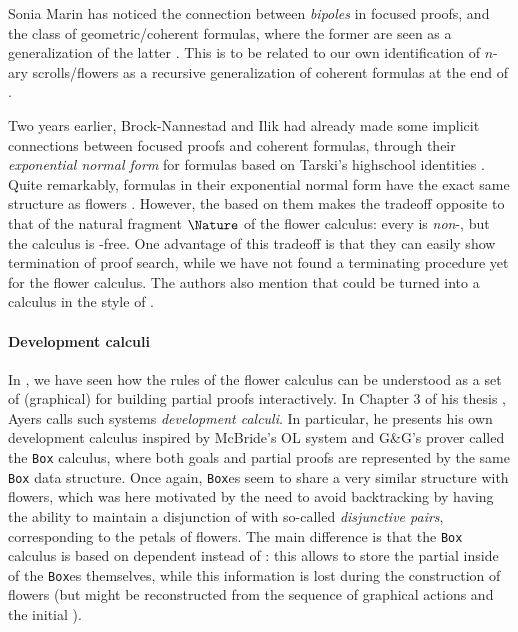 Sonia Marin has noticed the connection between \emph{bipoles} in focused proofs,
and the class of geometric/coherent formulas, where the former are seen as a
generalization of the latter . This is to be related
to our own identification of $n$-ary scrolls/flowers as a recursive
generalization of coherent formulas at the end of .

Two years earlier, Brock-Nannestad and Ilik had already made some implicit
connections between focused proofs and coherent formulas, through their
\emph{exponential normal form} for  formulas based on Tarski's
highschool identities . Quite
remarkably,  formulas in their exponential normal form have the exact
same structure as flowers
\cite[Definition~4.2]{brock-nannestad_intuitionistic_2019}. However, the   based on them makes the tradeoff opposite to that of the
natural fragment $\Nature$ of the flower calculus: every  is
\emph{non}-, but the calculus is -free. One advantage of
this tradeoff is that they can easily show termination of proof search, while we
have not found a terminating procedure yet for the flower calculus. The authors
also mention that  could be turned into a  calculus in the
style of .

\paragraph{Development calculi}

In , we have seen how the rules of the flower calculus
can be understood as a set of (graphical)  for building partial proofs
interactively. In Chapter 3 of his thesis , Ayers calls
such systems \emph{development calculi}. In particular, he presents his own
development calculus inspired by McBride's OL system
 and G\&G's prover
 called the \texttt{Box} calculus, where both
goals and partial proofs are represented by the same \texttt{Box} data
structure. Once again, \texttt{Box}es seem to share a very similar structure
with flowers, which was here motivated by the need to avoid backtracking by
having the ability to maintain a disjunction of  with so-called
\emph{disjunctive pairs}, corresponding to the petals of flowers. The main
difference is that the \texttt{Box} calculus is based on dependent 
instead of : this allows to store the partial 
inside of the \texttt{Box}es themselves, while this information is lost during
the construction of flowers (but might be reconstructed from the sequence of
graphical actions and the initial ).

